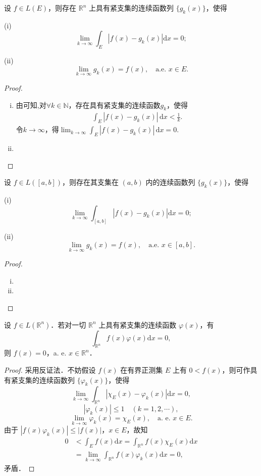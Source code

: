 \documentclass[../../main.tex]{subfiles}%
\begin{document}
\begin{corollary}
设 \( f \in L(E) \)，则存在 \( \mathbb{R}^n \) 上具有紧支集的连续函数列 \( \{ g_k(x) \} \)，使得

(i)
\[
\lim_{k \to \infty} \int_E |f(x) - g_k(x)| \mathrm{d}x = 0;
\]

(ii)
\[
\lim_{k \to \infty} g_k(x) = f(x), \quad \text{a.e. } x \in E.
\]
\end{corollary}
\begin{proof}
\begin{enumerate}[(i)]
\item 由可知,对\(\forall k \in \mathbb{N}\)，存在具有紧支集的连续函数\(g_k\)，使得
\begin{align*}
\int_E \left| f(x) - g_k(x) \right| \, \mathrm{d}x < \frac{1}{k}.
\end{align*}
令\(k \to \infty\)，得\(\lim_{k \to \infty} \int_E \left| f(x) - g_k(x) \right| \, \mathrm{d}x = 0\).

\item 
\end{enumerate}
\end{proof}

\begin{corollary}
设 \( f \in L([a,b]) \)，则存在其支集在 \( (a,b) \) 内的连续函数列 \( \{ g_k(x) \} \)，使得

(i)
\[
\lim_{k \to \infty} \int_{[a,b]} |f(x) - g_k(x)| \mathrm{d}x = 0;
\]

(ii)
\[
\lim_{k \to \infty} g_k(x) = f(x), \quad \text{a.e. } x \in [a,b].
\]
\end{corollary}
\begin{proof}
\begin{enumerate}[(i)]
\item 

\item 
\end{enumerate}
\end{proof}

\begin{example}
设 \( f \in L(\mathbb{R}^n) \)．若对一切 \( \mathbb{R}^n \) 上具有紧支集的连续函数 \( \varphi(x) \)，有
\[
\int_{\mathbb{R}^n} f(x)\varphi(x) \mathrm{d}x = 0,
\]
则 \( f(x) = 0 \)，a. e. \( x \in \mathbb{R}^n \)．
\end{example}
\begin{proof}
采用反证法．不妨假设 \( f(x) \) 在有界正测集 \( E \) 上有 \( 0 < f(x) \)，则可作具有紧支集的连续函数列 \( \{ \varphi_k(x) \} \)，使得
\[
\lim_{k \to \infty} \int_{\mathbb{R}^n} |\chi_E(x) - \varphi_k(x)| \mathrm{d}x = 0,
\]
\[
|\varphi_k(x)| \leqslant 1 \quad (k = 1,2,\cdots),
\]
\[
\lim_{k \to \infty} \varphi_k(x) = \chi_E(x), \quad \text{a. e. } x \in E.
\]
由于 \( |f(x)\varphi_k(x)| \leqslant |f(x)| \)，\( x \in E \)，故知
\begin{align*}
0 &< \int_E f(x) \mathrm{d}x = \int_{\mathbb{R}^n} f(x)\chi_E(x) \mathrm{d}x \\
&= \lim_{k \to \infty} \int_{\mathbb{R}^n} f(x)\varphi_k(x) \mathrm{d}x = 0,
\end{align*}
矛盾．
\end{proof}
\end{document}
